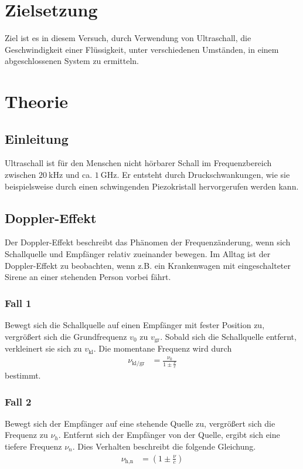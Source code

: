 \section{Zielsetzung}
Ziel ist es in diesem Versuch, durch Verwendung von Ultraschall, die Geschwindigkeit einer Flüssigkeit, unter verschiedenen Umständen, in einem abgeschlossenen System zu ermitteln.


\section{Theorie}
\label{sec:Theorie}
\subsection{Einleitung}
Ultraschall ist für den Menschen nicht hörbarer Schall im Frequenzbereich zwischen $\SI{20}{\kilo\hertz}$ und ca. $\SI{1}{\giga\hertz}$.
Er entsteht durch Druckschwankungen, wie sie beispielsweise durch einen schwingenden Piezokristall hervorgerufen werden kann.

\subsection{Doppler-Effekt}
Der Doppler-Effekt beschreibt das Phänomen der Frequenzänderung, wenn sich Schallquelle und Empfänger relativ zueinander bewegen.
Im Alltag ist der Doppler-Effekt zu beobachten, wenn z.B. ein Krankenwagen mit eingeschalteter Sirene an einer stehenden Person vorbei fährt.
\subsubsection{Fall 1}
Bewegt sich die Schallquelle auf einen Empfänger mit fester Position zu, vergrößert sich die Grundfrequenz $v_0$ zu $v_\textrm{gr}$.
Sobald sich die Schallquelle entfernt, verkleinert sie sich zu $v_\textrm{kl}$.
Die momentane Frequenz wird durch
\begin{align}
  \nu_\textrm{kl/gr} &= \frac{\nu_0}{1 \pm \frac{\nu}{c}}
  \label{eq:Doppler_1}
\end{align}
bestimmt.
\subsubsection{Fall 2}
Bewegt sich der Empfänger auf eine stehende Quelle zu, vergrößert sich die Frequenz zu $\nu_h$. Entfernt sich der Empfänger von der Quelle, ergibt sich eine tiefere Frequenz $\nu_n$. Dies Verhalten beschreibt die folgende Gleichung.
\begin{align}
  \nu_\textrm{h,n} &= (1 \pm \frac{\nu}{c}) 
  \label{eq:Doppler_2}
\end{align}
